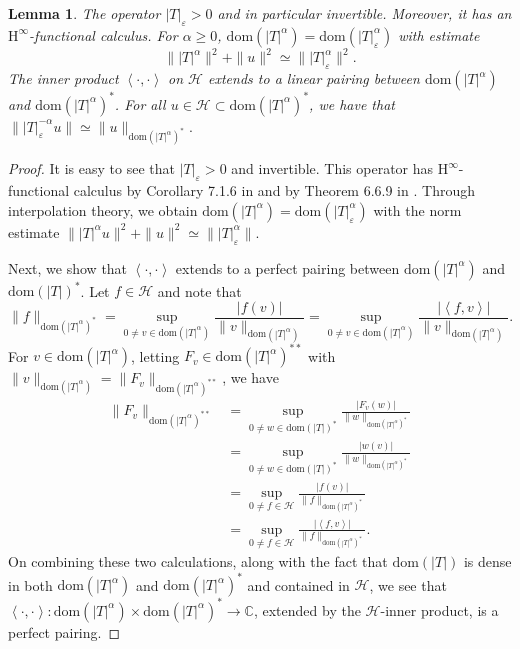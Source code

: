 \documentclass[a4paper,10pt,reqno]{amsart}
\newcommand{\C}{\mathbb{C}}
\newcommand{\modulus}[1]{|#1|}
\newcommand{\norm}[1]{\| #1 \|}%
\newcommand{\Hil}{\mathscr{H}}
\newcommand{\dom}{\mathrm{dom}}
\newcommand{\inprod}[1]{\left\langle #1 \right\rangle}%
\renewcommand{\epsilon}{\varepsilon}
\newcommand{\Hinfty}{$\mathrm{H}^\infty$}
\newtheorem{lemma}[theorem]{Lemma}
\theoremstyle{definition}
\begin{document}
\begin{lemma}
\label{Lem:Frac}
The operator $\modulus{T}_\epsilon > 0$ and in particular invertible.
Moreover, it has an \Hinfty-functional calculus.
For $\alpha \geq 0$,  $\dom(\modulus{T}^\alpha) = \dom(\modulus{T}_\epsilon^\alpha)$ with estimate
$$\norm{\modulus{T}^\alpha}^2 + \norm{u}^2 \simeq \norm{\modulus{T}_\epsilon^\alpha}^2.$$
The inner product $\inprod{\cdot,\cdot}$ on $\Hil$ extends to a linear pairing between $\dom(\modulus{T}^\alpha)$ and $\dom(\modulus{T}^\alpha)^\ast$.
For all $u \in \Hil \subset \dom(\modulus{T}^\alpha)^\ast$, we have that $\norm{\modulus{T}_\epsilon^{-\alpha}u} \simeq \norm{u}_{\dom(\modulus{T}^\alpha)^\ast}.$
\end{lemma}
\begin{proof}
It is easy to see that $\modulus{T}_\epsilon > 0$ and invertible.
This operator has \Hinfty-functional calculus  by Corollary 7.1.6 in \cite{Haase} and by Theorem 6.6.9 in \cite{Haase}.
Through interpolation theory, we obtain $\dom(\modulus{T}^\alpha) = \dom(\modulus{T}_\epsilon^\alpha)$ with the norm estimate $\norm{\modulus{T}^\alpha u}^2 + \norm{u}^2 \simeq \norm{\modulus{T}_\epsilon^\alpha}$.

Next, we show that $\inprod{\cdot,\cdot}$ extends to a perfect pairing between $\dom(\modulus{T}^\alpha)$ and $\dom(\modulus{T})^\ast$.
Let $f \in \Hil$ and note that
$$ \norm{f}_{\dom(\modulus{T}^\alpha)^\ast}
= \sup_{0 \neq v \in \dom(\modulus{T}^\alpha)} \frac{\modulus{f(v)}}{\norm{v}_{\dom(\modulus{T}^\alpha)}}
= \sup_{0 \neq v \in \dom(\modulus{T}^\alpha)} \frac{\modulus{\inprod{f,v}}}{\norm{v}_{\dom(\modulus{T}^\alpha)}}.$$
For $v \in \dom(\modulus{T}^\alpha)$, letting $F_v \in \dom(\modulus{T}^\alpha)^{\ast\ast}$ with $\norm{v}_{\dom(\modulus{T}^\alpha)} = \norm{F_v}_{\dom(\modulus{T}^\alpha)^{\ast\ast}}$, we have
\begin{align*}
\norm{F_v}_{\dom(\modulus{T}^\alpha)^{\ast\ast}}
 & = \sup_{0 \neq w \in \dom(\modulus{T})^\ast} \frac{\modulus{F_v(w)}}{\norm{w}_{\dom(\modulus{T}^\alpha)^\ast}} \\
 & =  \sup_{0 \neq w \in \dom(\modulus{T})^\ast} \frac{\modulus{w(v)}}{\norm{w}_{\dom(\modulus{T}^\alpha)^\ast}}  \\
 & = \sup_{0 \neq f \in \Hil} \frac{\modulus{f(v)}}{\norm{f}_{\dom(\modulus{T}^\alpha)^\ast}}                     \\
 & =  \sup_{0 \neq f \in \Hil} \frac{\modulus{\inprod{f,v}}}{\norm{f}_{\dom(\modulus{T}^\alpha)^\ast}}.
\end{align*}
On combining these two calculations, along with the fact that $\dom(|T|)$ is dense in both $\dom(\modulus{T}^\alpha)$ and $\dom(\modulus{T}^\alpha)^\ast$ and contained in $\Hil$, we see that $\inprod{\cdot,\cdot}:\dom(\modulus{T}^\alpha) \times \dom(\modulus{T}^\alpha)^\ast \to \C$, extended by the $\Hil$-inner product, is a perfect pairing.


\end{proof}
\end{document}

